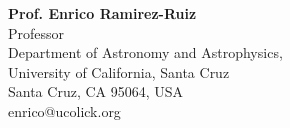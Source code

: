 \vspace{1cm}
\begin{addmargin}[-1em]{}
\begin{itemize}
\renewcommand{\labelitemi}{~}
  \begin{minipage}{0.6\textwidth}
    \renewcommand{\labelitemi}{~}
    \item \textbf{Prof. Enrico Ramirez-Ruiz}\\
    Professor \\
    Department  of  Astronomy  and  Astrophysics, \\
    University of California, Santa Cruz \\
    Santa Cruz, CA 95064, USA \\
    enrico@ucolick.org
  \end{minipage}
  \begin{minipage}{0.5\textwidth}
   \renewcommand{\labelitemi}{~}
    \item
  \end{minipage}
\end{itemize}
\end{addmargin}
      

\nocite{*}







